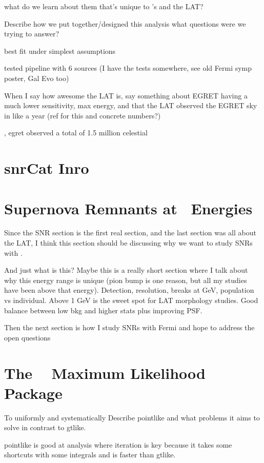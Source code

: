 { 
what do we learn about them that's unique to \gam 's and the LAT?
 
Describe how we put together/designed this analysis what questions were we trying to answer?

best fit under simplest assumptions

tested pipeline with 6 sources (I have the tests somewhere, see old Fermi symp poster, Gal Evo too)

When I say how awesome the LAT is, say something about EGRET having a much lower sensitivity, max energy, and that the LAT observed the EGRET sky in like a year (ref for this and concrete numbers?)

\cite{Thomson93}, egret observed a total of 1.5 million celestial \gam{}
\section{\label{snrCat:catIntro}snrCat Inro}


\section{\label{snrCat:latGam}Supernova Remnants at \gam~Energies}

Since the SNR section is the first real section, and the last section was all about the LAT, I think this section should be discussing why we want to study SNRs with \gam.

And just what is this? Maybe this is a really short section where I talk about why this energy range is unique (pion bump is one reason, but all my studies have been above that energy). Detection, resolution, breaks at GeV, population vs individual. Above 1 GeV is the sweet spot for LAT morphology studies. Good balance between low bkg and higher stats plus improving PSF. 

Then the next section is how I study SNRs with Fermi and hope to address the open questions


\section{\label{snrCat:ptlk}The \ptlike~  Maximum Likelihood Package}

To uniformly and systematically 
Describe pointlike and what problems it aims to solve in contrast to gtlike.

pointlike is good at analysis where iteration is key because it takes some shortcuts with some integrals and is faster than gtlike. 

}
